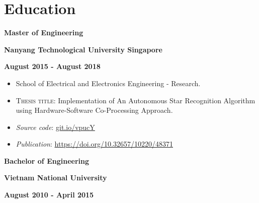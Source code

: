 \documentclass[10pt]{article}
\begin{document}
    \vspace{2mm}
    \section{Education}
        \vspace{-2mm}
        \begin{multicols}{3}
                \textbf{Master of Engineering}

            \columnbreak

                \textbf{Nanyang Technological University Singapore}

            \columnbreak

            \begin{flushright}
                \textbf{August 2015 - August 2018}
            \end{flushright}
        \end{multicols}

        \vspace{-5mm}
        \begin{itemize}[noitemsep]
            \item School of Electrical and Electronics Engineering - Research.
            \item \textsc{Thesis title}: Implementation of An Autonomous Star Recognition Algorithm using Hardware-Software Co-Processing Approach.
            \item \emph{Source code}: \href{https://git.io/vpucY}{git.io/vpucY}
            \item \emph{Publication}: \href{https://doi.org/10.32657/10220/48371}{https://doi.org/10.32657/10220/48371}
        \end{itemize}
        \vspace{-2mm}

        \begin{multicols}{3}
            \begin{flushleft}
                \textbf{Bachelor of Engineering}
            \end{flushleft}

            \columnbreak

            \begin{center}
                \textbf{Vietnam National University}
            \end{center}

            \columnbreak

            \begin{flushright}
                \textbf{August 2010 - April 2015}
            \end{flushright}
        \end{multicols}
\end{document}
